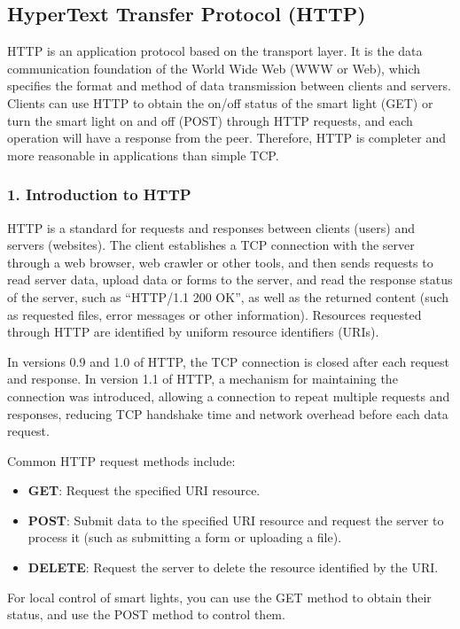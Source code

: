 \documentclass[a4paper,12pt]{book}
\begin{document}
\subsection{HyperText Transfer Protocol (HTTP)}
HTTP is an application protocol based on the transport layer. It is the data communication foundation of the World Wide Web (WWW or Web), which specifies the format and method of data transmission between clients and servers. Clients can use HTTP to obtain the on/off status of the smart light (GET) or turn the smart light on and off (POST) through HTTP requests, and each operation will have a response from the peer. Therefore, HTTP is completer and more reasonable in applications than simple TCP.

\subsubsection{1. Introduction to HTTP}
HTTP is a standard for requests and responses between clients (users) and servers (websites). The client establishes a TCP connection with the server through a web browser, web crawler or other tools, and then sends requests to read server data, upload data or forms to the server, and read the response status of the server, such as “HTTP/1.1 200 OK”, as well as the returned content (such as requested files, error messages or other information). Resources requested through HTTP are identified by uniform resource identifiers (URIs).

In versions 0.9 and 1.0 of HTTP, the TCP connection is closed after each request and response. In version 1.1 of HTTP, a mechanism for maintaining the connection was introduced, allowing a connection to repeat multiple requests and responses, reducing TCP handshake time and network overhead before each data request.

Common HTTP request methods include:

\begin{itemize}[noitemsep]
    \item \textbf{GET}: Request the specified URI resource.
    \item \textbf{POST}: Submit data to the specified URI resource and request the server to process it (such as submitting a form or uploading a file).
    \item \textbf{DELETE}: Request the server to delete the resource identified by the URI.
\end{itemize}

For local control of smart lights, you can use the GET method to obtain their status, and use the POST method to control them.
\end{document}

